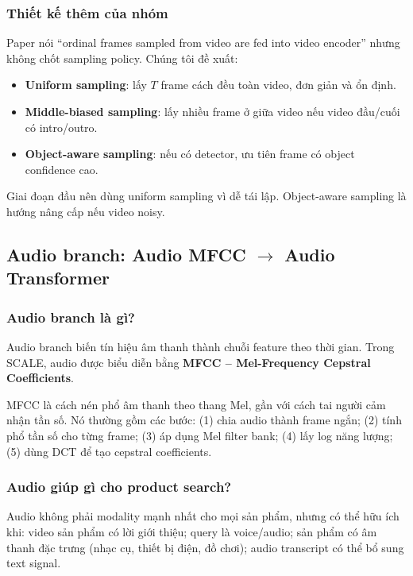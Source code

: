 \documentclass[12pt,a4paper]{article}
\begin{document}
\subsubsection{Thiết kế thêm của nhóm}
Paper nói ``ordinal frames sampled from video are fed into video encoder'' nhưng không chốt sampling policy. Chúng tôi đề xuất:
\begin{itemize}
  \item \textbf{Uniform sampling}: lấy $T$ frame cách đều toàn video, đơn giản và ổn định.
  \item \textbf{Middle-biased sampling}: lấy nhiều frame ở giữa video nếu video đầu/cuối có intro/outro.
  \item \textbf{Object-aware sampling}: nếu có detector, ưu tiên frame có object confidence cao.
\end{itemize}

Giai đoạn đầu nên dùng uniform sampling vì dễ tái lập. Object-aware sampling là hướng nâng cấp nếu video noisy.

\subsection{Audio branch: Audio MFCC $\to$ Audio Transformer}

\subsubsection{Audio branch là gì?}
Audio branch biến tín hiệu âm thanh thành chuỗi feature theo thời gian. Trong SCALE, audio được biểu diễn bằng \textbf{MFCC -- Mel-Frequency Cepstral Coefficients}.

MFCC là cách nén phổ âm thanh theo thang Mel, gần với cách tai người cảm nhận tần số. Nó thường gồm các bước: (1) chia audio thành frame ngắn; (2) tính phổ tần số cho từng frame; (3) áp dụng Mel filter bank; (4) lấy log năng lượng; (5) dùng DCT để tạo cepstral coefficients.

\subsubsection{Audio giúp gì cho product search?}
Audio không phải modality mạnh nhất cho mọi sản phẩm, nhưng có thể hữu ích khi: video sản phẩm có lời giới thiệu; query là voice/audio; sản phẩm có âm thanh đặc trưng (nhạc cụ, thiết bị điện, đồ chơi); audio transcript có thể bổ sung text signal.
\end{document}
